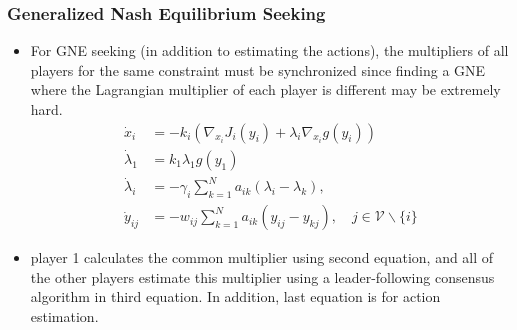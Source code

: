 \begin{frame}
  \frametitle{\normalsize{Generalized Nash Equilibrium Seeking}}\small
  
\begin{itemize}

  \item For GNE seeking (in addition to estimating the actions), the multipliers of all players for the same constraint must be synchronized since finding a GNE where the Lagrangian multiplier of each player is different may be extremely hard.
  \begin{equation}
  \begin{aligned}
    \dot{x}_{i} & =-k_{i}\left(\nabla_{x_{i}} J_{i}\left(y_{i}\right)+\lambda_{i} \nabla_{x_{i}} g\left(y_{i}\right)\right) \\
    \dot{\lambda}_{1} & =k_{1} \lambda_{1} g\left(y_{1}\right)\\
    \dot{\lambda}_{i} & =-\gamma_{i} \sum_{k=1}^{N} a_{i k}\left(\lambda_{i}-\lambda_{k}\right), \\
    \dot{y}_{i j} & =-w_{i j} \sum_{k=1}^{N} a_{i k}\left(y_{i j}-y_{k j}\right), \quad j \in \mathcal{V} \backslash\{i\}
  \end{aligned}
  \end{equation}
  \item  player 1  calculates the common multiplier using second equation, and all of the
  other players estimate this multiplier using a leader-following consensus algorithm in third equation. In addition, last equation is
  for action estimation.
\end{itemize}
\end{frame}


